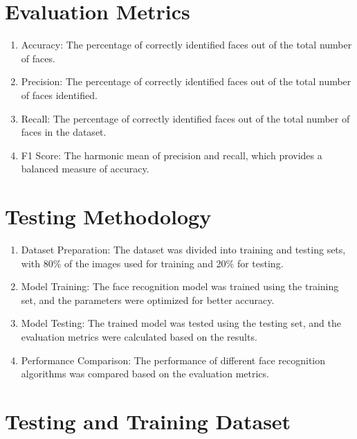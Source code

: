 \documentclass[openany]{report}
\begin{document}
\section{Evaluation Metrics}

\begin{enumerate}
    \item Accuracy: The percentage of correctly identified faces out of the total number of faces.
    \item Precision: The percentage of correctly identified faces out of the total number of faces identified.
    \item Recall: The percentage of correctly identified faces out of the total number of faces in the dataset.
    \item F1 Score: The harmonic mean of precision and recall, which provides a balanced measure of accuracy.
\end{enumerate}


\section{Testing Methodology}
\begin{enumerate}
    \item Dataset Preparation: The dataset was divided into training and testing sets, with 80\% of the images used for training and 20\% for testing.
    \item Model Training: The face recognition model was trained using the training set, and the parameters were optimized for better accuracy.
    \item Model Testing: The trained model was tested using the testing set, and the evaluation metrics were calculated based on the results.
    \item Performance Comparison: The performance of different face recognition algorithms was compared based on the evaluation metrics.
\end{enumerate}

\section{Testing and Training Dataset}
\end{document}
